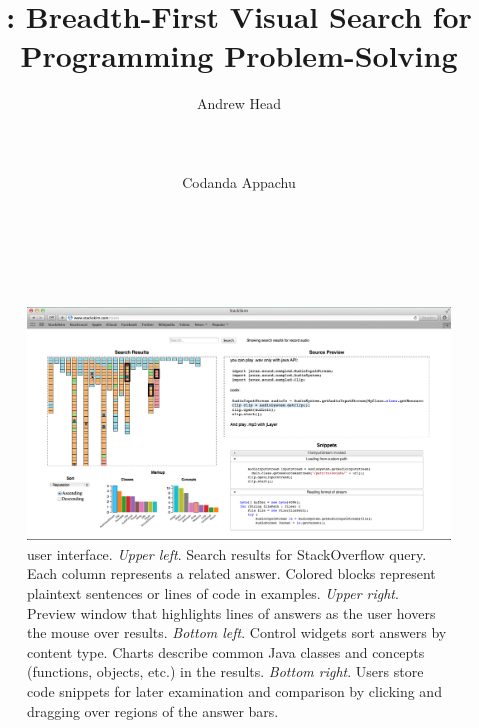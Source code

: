 \documentclass{sigchi}
\begin{document}
\title{\systemname{}: Breadth-First Visual Search for Programming Problem-Solving}

\author{
  \alignauthor Andrew Head\\
    \\
    \\
    \\
  \alignauthor Codanda Appachu\\
    \\
    \\
    \\
}

\makeatletter
\let\@oldmaketitle\@maketitle
\renewcommand{\@maketitle}{\@oldmaketitle}
\makeatother

\maketitle





\begin{figure}
 \centering
 \includegraphics[width=.9\linewidth]{figures/ui_full}
 \caption{\systemname{} user interface. 
 \emph{Upper left}.
 Search results for StackOverflow query.
 Each column represents a related answer.
 Colored blocks represent plaintext sentences or lines of code in examples.
 \emph{Upper right}.
 Preview window that highlights lines of answers as the user hovers the mouse over results.
 \emph{Bottom left}.
 Control widgets sort answers by content type.
 Charts describe common Java classes and concepts (functions, objects, etc.) in the results.
 \emph{Bottom right}.
 Users store code snippets for later examination and comparison by clicking and dragging over regions of the answer bars.
 }
 \label{fig:user_interface}
\end{figure}
\end{document}
